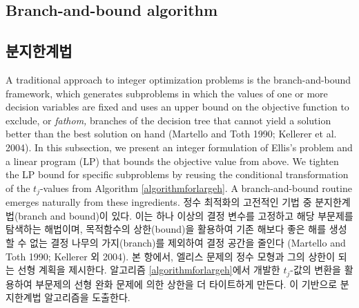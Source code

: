 \documentclass[11pt]{article} %
\theoremstyle{definition}
\theoremstyle{definition}
\begin{document}
\ifen \subsection{Branch-and-bound algorithm} \else \subsection{분지한계법} \fi \label{subsectionbranchbound}
\ifen 
A traditional approach to integer optimization problems is the branch-and-bound framework, which generates subproblems in which the values of one or more decision variables are fixed and uses an upper bound on the objective function to exclude, or \emph{fathom,} branches of the decision tree that cannot yield a solution better than the best solution on hand (Martello and Toth 1990; Kellerer et al. 2004). In this subsection, we present an integer formulation of Ellis's problem and a linear program (LP) that bounds the objective value from above. We tighten the LP bound for specific subproblems by reusing the conditional transformation of the $t_j$-values from Algorithm \ref{algorithmforlargeh}. A branch-and-bound routine emerges naturally from these ingredients.
\else
정수 최적화의 고전적인 기법 중 분지한계법(branch and bound)이 있다. 이는 하나 이상의 결정 변수를 고정하고 해당 부문제를 탐색하는 해법이며, 목적함수의 상한(bound)을 활용하여 기존 해보다 좋은 해를 생성할 수 없는 결정 나무의 가지(branch)를 제외하여 결정 공간을 줄인다 (Martello and Toth 1990; Kellerer 외 2004). 본 항에서, 엘리스 문제의 정수 모형과 그의 상한이 되는 선형 계획을 제시한다. 알고리즘 \ref{algorithmforlargeh}에서 개발한 $t_j$-값의 변환을 활용하여 부문제의 선형 완화 문제에 의한 상한을 더 타이트하게 만든다. 이 기반으로 분지한계법 알고리즘을 도출한다.
\fi
\end{document}
